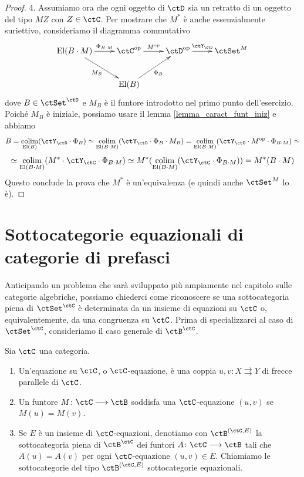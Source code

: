 \begin{proof}
 4. Assumiamo ora che ogni oggetto di \(\ctD\) sia un retratto di un  oggetto del tipo \(MZ\) con \(Z \in \ctC\). Per mostrare che
 \(M^*\) è anche essenzialmente suriettivo, consideriamo il diagramma commutativo
 \[ \xymatrix{ \mathrm{El}(B \cmp M) \ar[r]^-{\Phi_{B \cmp M}} \ar[rd]_{M_B} & \ctC^{\op} \ar[r]^-{M^{\op}}
  & \ctD^{\op} \ar[r]^-{\ctY_{\ctD}} & \ctSet^M \\
  & \mathrm{El}(B) \ar[ru]_{\Phi_B} } \]
 dove \(B \in \ctSet^{\ctD}\) e \(M_B\) è il funtore introdotto nel primo punto dell'esercizio.
 Poiché \(M_B\) è iniziale, possiamo usare il lemma \ref{lemma_caract_funt_iniz} e abbiamo
 \[ B = \colim_{\mathrm{El}(B)}(\ctY_{\ctD} \cmp \Phi_B) \simeq \colim_{\mathrm{El}(B \cmp M)}(\ctY_{\ctD} \cmp \Phi_B \cmp M_B)
  = \colim_{\mathrm{El}(B \cmp M)}(\ctY_{\ctD} \cmp M^{\op} \cmp \Phi_{B \cmp M}) \simeq \]
 \[ \simeq \colim_{\mathrm{El}(B \cmp M)}(M^* \cmp \ctY_{\ctC} \cmp \Phi_{B \cmp M}) \simeq
  M^*(\colim_{\mathrm{El}(B \cmp M)}(\ctY_{\ctC} \cmp \Phi_{B \cmp M})) = M^*(B \cmp M) \]
 Questo conclude la prova che \(M^*\) è un'equivalenza (e quindi anche \(\ctSet^M\) lo è).
\end{proof}

\section{Sottocategorie equazionali di categorie di prefasci}\label{sec_birk_prefasci}

Anticipando un problema che sarà sviluppato più ampiamente nel capitolo sulle categorie algebriche, possiamo chiederci come
riconoscere se una sottocategoria piena di \(\ctSet^\ctC\) è determinata da un insieme di equazioni su \(\ctC\) o, equivalentemente,
da una congruenza su \(\ctC\). Prima di specializzarci al caso di \(\ctSet^\ctC\), consideriamo il caso generale di \(\ctB^\ctC\).

\begin{definition}\label{def_equaz_cat}
 Sia \(\ctC\) una categoria.
 \begin{enumerate}
  \item Un'equazione su \(\ctC\), o \(\ctC\)-equazione, è una coppia \(u,v \colon X \rightrightarrows Y\) di frecce parallele di \(\ctC\).
  \item Un funtore \(M \colon \ctC \fun \ctB\) soddisfa una \(\ctC\)-equazione \((u,v)\) se \(M(u)=M(v)\).
  \item Se \(E\) è un insieme di \(\ctC\)-equazioni, denotiamo con \(\ctB^{(\ctC,E)}\) la sottocategoria piena di \(\ctB^\ctC\)
        dei funtori \(A \colon \ctC \fun \ctB\) tali che \(A(u)=A(v)\) per ogni \(\ctC\)-equazione \((u,v) \in E\). Chiamiamo le sottocategorie
        del tipo \(\ctB^{(\ctC,E)}\) sottocategorie equazionali.
 \end{enumerate}
\end{definition}

